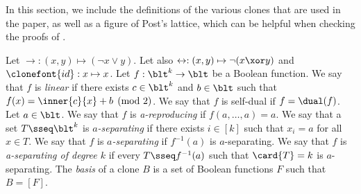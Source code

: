 \documentclass[11pt]{article}
\begin{document}
In this section, we include
 the definitions of the various clones that are used in the
paper,
as well as
a figure of Post's lattice, which can be helpful when checking the proofs
of
.

Let
$\rightarrow : (x,y) \mapsto (\neg x \lor y)$.
Let also
$\leftrightarrow : (x,y) \mapsto \neg (x \xor y)$
and
$\clonefont{id} : x \mapsto x$.
Let $f : \blt^k \to \blt$ be a Boolean function.
We say that 
$f$
is \emph{linear}
if there exists 
$c \in \blt^k$ and $b \in \blt$
such that
$f(x) = \inner{c}{x} + b \pmod 2$.
We say that $f$ is self-dual if $f = \dual(f)$. Let $a \in \blt$.
We say that $f$ is 
\emph{a-reproducing}
if
$f(a,\dots,a) = a$.
We say that
a set $T \sseq \blt^k$ is 
\emph{$a$-separating}
if there exists $i \in [k]$
such that
$x_i = a$ for all $x \in T$.
We say that
$f$ is 
\emph{$a$-separating}
if
$f^{-1}(a)$ is $a$-separating.
We say that $f$ is 
\emph{a-separating of degree $k$}
if every $T \sseq f^{-1}(a)$
such that $\card{T} = k$ is $a$-separating. The \emph{basis} of a clone $B$ is a set of Boolean functions $F$
such that $B = [F]$.

 
\end{document}
